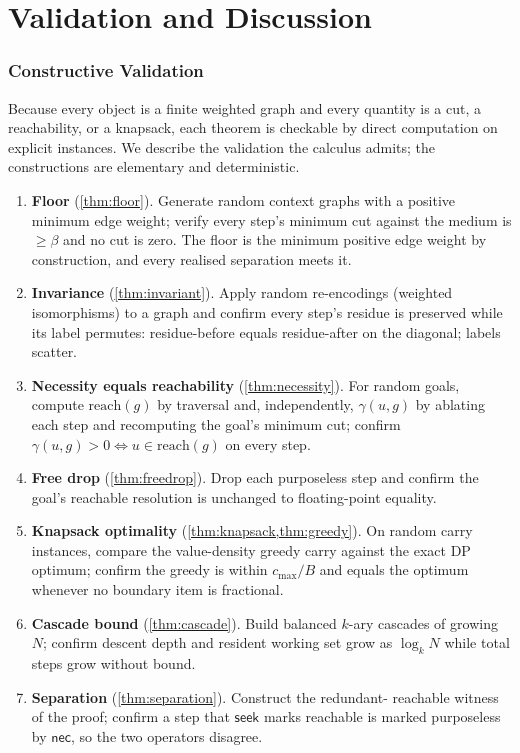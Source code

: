 \documentclass[11pt,a4paper]{article}
\theoremstyle{thmstyle}
\theoremstyle{definition}
\theoremstyle{remark}
\newcommand{\flo}{\beta}                %
\newcommand{\goal}{g}                   %
\newcommand{\reach}{\mathrm{reach}}
\newcommand{\contrib}{\gamma}           %
\newcommand{\budget}{B}
\newcommand{\seek}{\textsf{seek}}
\newcommand{\nec}{\textsf{nec}}
\newcommand{\cost}{c}                   %
\begin{document}
\part{Validation and Discussion}

\section{Constructive Validation}
\label{sec:validation}

Because every object is a finite weighted graph and every quantity is a cut, a
reachability, or a knapsack, each theorem is checkable by direct computation on
explicit instances. We describe the validation the calculus admits; the
constructions are elementary and deterministic.

\begin{enumerate}[leftmargin=1.6em,itemsep=3pt]
\item \textbf{Floor} (\cref{thm:floor}). Generate random context graphs with a
positive minimum edge weight; verify every step's minimum cut against the medium
is $\ge\flo$ and no cut is zero. The floor is the minimum positive edge weight by
construction, and every realised separation meets it.
\item \textbf{Invariance} (\cref{thm:invariant}). Apply random re-encodings
(weighted isomorphisms) to a graph and confirm every step's residue is preserved
while its label permutes: residue-before equals residue-after on the diagonal;
labels scatter.
\item \textbf{Necessity equals reachability} (\cref{thm:necessity}). For random
goals, compute $\reach(\goal)$ by traversal and, independently,
$\contrib(u,\goal)$ by ablating each step and recomputing the goal's minimum cut;
confirm $\contrib(u,\goal)>0\iff u\in\reach(\goal)$ on every step.
\item \textbf{Free drop} (\cref{thm:freedrop}). Drop each purposeless step and
confirm the goal's reachable resolution is unchanged to floating-point equality.
\item \textbf{Knapsack optimality} (\cref{thm:knapsack,thm:greedy}). On random
carry instances, compare the value-density greedy carry against the exact DP
optimum; confirm the greedy is within $\cost_{\max}/\budget$ and equals the
optimum whenever no boundary item is fractional.
\item \textbf{Cascade bound} (\cref{thm:cascade}). Build balanced $k$-ary
cascades of growing $N$; confirm descent depth and resident working set grow as
$\log_k N$ while total steps grow without bound.
\item \textbf{Separation} (\cref{thm:separation}). Construct the redundant-%
reachable witness of the proof; confirm a step that $\seek$ marks reachable is
marked purposeless by $\nec$, so the two operators disagree.
\end{enumerate}
\end{document}
